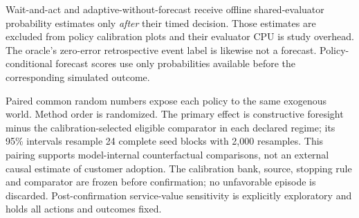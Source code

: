 Wait-and-act and adaptive-without-forecast receive offline shared-evaluator probability estimates only \emph{after} their timed decision. Those estimates are excluded from policy calibration plots and their evaluator CPU is study overhead. The oracle's zero-error retrospective event label is likewise not a forecast. Policy-conditional forecast scores use only probabilities available before the corresponding simulated outcome.

Paired common random numbers expose each policy to the same exogenous world. Method order is randomized. The primary effect is constructive foresight minus the calibration-selected eligible comparator in each declared regime; its 95\% intervals resample 24 complete seed blocks with 2,000 resamples. This pairing supports model-internal counterfactual comparisons, not an external causal estimate of customer adoption. \citep{rubin1974} The calibration bank, source, stopping rule and comparator are frozen before confirmation; no unfavorable episode is discarded. Post-confirmation service-value sensitivity is explicitly exploratory and holds all actions and outcomes fixed.

